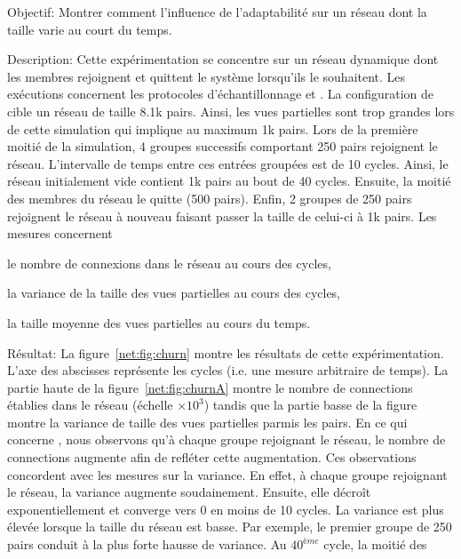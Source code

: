 \begin{asparadesc}
\item [Objectif:] Montrer comment l'influence de l'adaptabilité sur un réseau
  dont la taille varie au court du temps.
\item [Description:] Cette expérimentation se concentre sur un réseau dynamique
  dont les membres rejoignent et quittent le système lorsqu'ils le
  souhaitent. Les exécutions concernent les protocoles d'échantillonnage \CYCLON
  et \SPRAY. La configuration de \CYCLON cible un réseau de taille 8.1k
  pairs. Ainsi, les vues partielles sont trop grandes lors de cette simulation
  qui implique au maximum 1k pairs. Lors de la première moitié de la simulation,
  4 groupes successifs comportant 250 pairs rejoignent le réseau. L'intervalle
  de temps entre ces entrées groupées est de 10 cycles. Ainsi, le réseau
  initialement vide contient 1k pairs au bout de 40 cycles. Ensuite, la moitié
  des membres du réseau le quitte (500 pairs). Enfin, 2 groupes de 250 pairs
  rejoignent le réseau à nouveau faisant passer la taille de celui-ci à 1k
  pairs. Les mesures concernent
  \begin{inparaenum}[(i)]
  \item le nombre de connexions dans le réseau au cours des cycles,
  \item la variance de la taille des vues partielles au cours des cycles,
  \item la taille moyenne des vues partielles au cours du temps.
  \end{inparaenum}
\item [Résultat:] La figure~\ref{net:fig:churn} montre les résultats de cette
  expérimentation. L'axe des abscisses représente les cycles (i.e. une mesure
  arbitraire de temps). La partie haute de la figure~\ref{net:fig:churnA}
  montre le nombre de connections établies dans le réseau (échelle
  $\times 10^3$) tandis que la partie basse de la figure montre la variance de
  taille des vues partielles parmis les pairs. En ce qui concerne \SPRAY, nous
  observons qu'à chaque groupe rejoignant le réseau, le nombre de connections
  augmente afin de refléter cette augmentation. Ces observations concordent avec
  les mesures sur la variance. En effet, à chaque groupe rejoignant le réseau,
  la variance augmente soudainement. Ensuite, elle décroît exponentiellement et
  converge vers 0 en moins de 10 cycles. La variance est plus élevée lorsque la
  taille du réseau est basse. Par exemple, le premier groupe de 250 pairs
  conduit à la plus forte hausse de variance. Au $40^{ème}$ cycle, la moitié des

\end{asparadesc}
